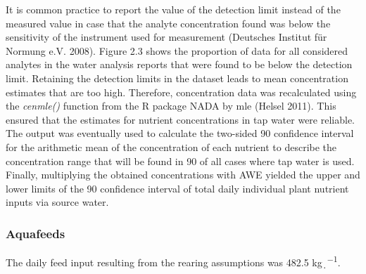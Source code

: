 \documentclass[preprint, 3p,
authoryear]{elsarticle} %
\begin{document}
It is common practice to report the value of the detection limit instead
of the measured value in case that the analyte concentration found was
below the sensitivity of the instrument used for measurement (Deutsches
Institut für Normung e.V. 2008). Figure 2.3 shows the proportion of data
for all considered analytes in the water analysis reports that were
found to be below the detection limit. Retaining the detection limits in
the dataset leads to mean concentration estimates that are too high.
Therefore, concentration data was recalculated using the \emph{cenmle()}
function from the R package NADA by \gls{mle} (Helsel 2011). This
ensured that the estimates for nutrient concentrations in tap water were
reliable. The output was eventually used to calculate the two-sided
\SI{90}{\p} confidence interval for the arithmetic mean of the
concentration of each nutrient to describe the concentration range that
will be found in \SI{90}{\p} of all cases where tap water is used.
Finally, multiplying the obtained concentrations with AWE yielded the
upper and lower limits of the \SI{90}{\p} confidence interval of total
daily individual plant nutrient inputs via source water.

\hypertarget{aquafeeds}{%
\subsubsection{Aquafeeds}\label{aquafeeds}}

The daily feed input resulting from the rearing assumptions was 482.5
\si{\kg\per\d}.
\end{document}
